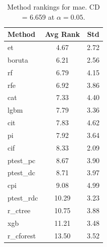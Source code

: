 \begin{table}[h]
\centering
\caption{Method rankings for mae. CD = 6.659 at $\alpha=0.05$.}
\label{tab:ranks_mae}
\begin{tabular}{lcc}
\toprule
Method & Avg Rank & Std \\
\midrule
et & 4.67 & 2.72 \\
boruta & 6.21 & 2.56 \\
rf & 6.79 & 4.15 \\
rfe & 6.92 & 3.86 \\
cat & 7.33 & 4.40 \\
lgbm & 7.79 & 3.36 \\
cit & 7.83 & 4.62 \\
pi & 7.92 & 3.64 \\
cif & 8.33 & 2.09 \\
ptest_pc & 8.67 & 3.90 \\
ptest_dc & 8.71 & 3.97 \\
cpi & 9.08 & 4.99 \\
ptest_rdc & 10.29 & 3.23 \\
r_ctree & 10.75 & 3.88 \\
xgb & 11.21 & 3.48 \\
r_cforest & 13.50 & 3.52 \\
\bottomrule
\end{tabular}
\end{table}